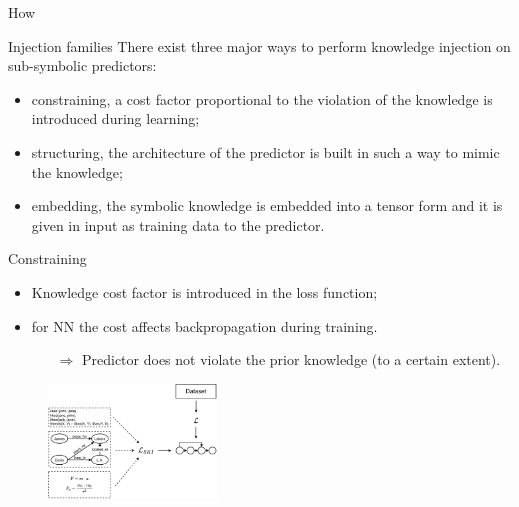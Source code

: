 \documentclass[presentation]{beamer}\mode<presentation>{\usetheme{AMSBolognaFC}}
\begin{document}
\begin{frame}[allowframebreaks]{How}
    \begin{block}{Injection families}
        There exist three major ways to perform knowledge injection on sub-symbolic predictors:
        \begin{itemize}
            \item \alert{constraining}, a cost factor proportional to the violation of the knowledge is introduced during learning;
            \item \alert{structuring}, the architecture of the predictor is built in such a way to mimic the knowledge;
            \item \alert{embedding}, the symbolic knowledge is embedded into a tensor form and it is given in input as training data to the predictor.
        \end{itemize} 
    \end{block}
    
    \framebreak

    \begin{block}{Constraining}
       \begin{itemize}
           \item Knowledge cost factor is introduced in the loss function;
           \item for NN the cost affects backpropagation  during training.
           \begin{itemize}
               \item[$\Rightarrow$] Predictor does not violate the prior knowledge (to a certain extent).
           \end{itemize} 
       \end{itemize}
       
       \begin{figure}
           \centering
           \includegraphics[width=0.4\textwidth]{figures/ski-constraining}
       \end{figure}
    \end{block}
    

\end{frame}
\end{document}
